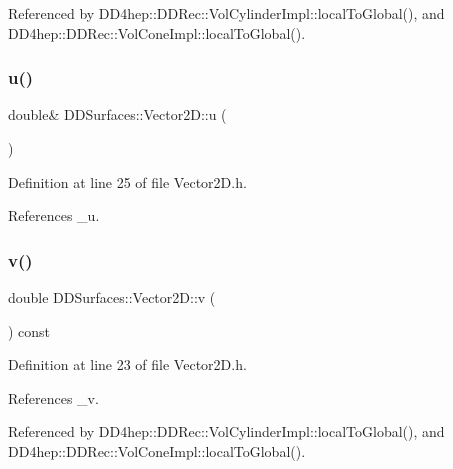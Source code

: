 Referenced by D\+D4hep\+::\+D\+D\+Rec\+::\+Vol\+Cylinder\+Impl\+::local\+To\+Global(), and D\+D4hep\+::\+D\+D\+Rec\+::\+Vol\+Cone\+Impl\+::local\+To\+Global().

\hypertarget{class_d_d_surfaces_1_1_vector2_d_a366947f28bc5da5b5581186158321489}{}\label{class_d_d_surfaces_1_1_vector2_d_a366947f28bc5da5b5581186158321489} 
\subsubsection{\texorpdfstring{u()}{u()}\hspace{0.1cm}{\footnotesize\ttfamily [2/2]}}
{\footnotesize\ttfamily double\& D\+D\+Surfaces\+::\+Vector2\+D\+::u (\begin{DoxyParamCaption}{ }\end{DoxyParamCaption})\hspace{0.3cm}{\ttfamily [inline]}}



Definition at line 25 of file Vector2\+D.\+h.



References \+\_\+u.

\hypertarget{class_d_d_surfaces_1_1_vector2_d_a8d2342cdbd926d05d97c500d9e11866f}{}\label{class_d_d_surfaces_1_1_vector2_d_a8d2342cdbd926d05d97c500d9e11866f} 
\subsubsection{\texorpdfstring{v()}{v()}\hspace{0.1cm}{\footnotesize\ttfamily [1/2]}}
{\footnotesize\ttfamily double D\+D\+Surfaces\+::\+Vector2\+D\+::v (\begin{DoxyParamCaption}{ }\end{DoxyParamCaption}) const\hspace{0.3cm}{\ttfamily [inline]}}



Definition at line 23 of file Vector2\+D.\+h.



References \+\_\+v.



Referenced by D\+D4hep\+::\+D\+D\+Rec\+::\+Vol\+Cylinder\+Impl\+::local\+To\+Global(), and D\+D4hep\+::\+D\+D\+Rec\+::\+Vol\+Cone\+Impl\+::local\+To\+Global().


